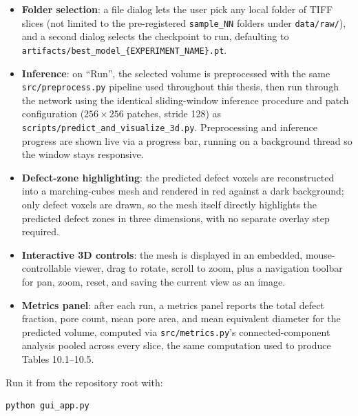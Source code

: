 \begin{itemize}
\item \textbf{Folder selection}: a file dialog lets the user pick any local folder of TIFF slices
  (not limited to the pre-registered \texttt{sample\_NN} folders under \texttt{data/raw/}), and a
  second dialog selects the checkpoint to run, defaulting to
  \texttt{artifacts/best\_model\_\{EXPERIMENT\_NAME\}.pt}.
\item \textbf{Inference}: on ``Run'', the selected volume is preprocessed with the same
  \texttt{src/preprocess.py} pipeline used throughout this thesis, then run through the network using
  the identical sliding-window inference procedure and patch configuration ($256 \times 256$ patches,
  stride 128) as \texttt{scripts/predict\_and\_visualize\_3d.py}. Preprocessing and inference progress
  are shown live via a progress bar, running on a background thread so the window stays responsive.
\item \textbf{Defect-zone highlighting}: the predicted defect voxels are reconstructed into a
  marching-cubes mesh and rendered in red against a dark background; only defect voxels are drawn, so
  the mesh itself directly highlights the predicted defect zones in three dimensions, with no separate
  overlay step required.
\item \textbf{Interactive 3D controls}: the mesh is displayed in an embedded, mouse-controllable
  viewer, drag to rotate, scroll to zoom, plus a navigation toolbar for pan, zoom, reset, and
  saving the current view as an image.
\item \textbf{Metrics panel}: after each run, a metrics panel reports the total defect fraction, pore
  count, mean pore area, and mean equivalent diameter for the predicted volume, computed via
  \texttt{src/metrics.py}'s connected-component analysis pooled across every slice, the same
  computation used to produce Tables 10.1--10.5.
\end{itemize}

Run it from the repository root with:
\begin{verbatim}
python gui_app.py
\end{verbatim}
